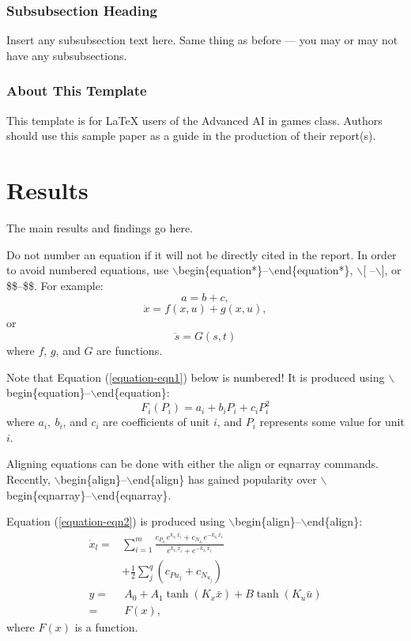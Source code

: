 \documentclass[conference]{IEEEtran}
\begin{document}
\subsubsection{Subsubsection Heading}
Insert any subsubsection text here.  Same thing as before --- you may
or may not have any subsubsections.

\subsubsection{About This Template}
This template is for LaTeX users of the Advanced AI in games class.
Authors should use this sample paper as a guide in the production of
their report(s).

\section{Results}
The main results and findings go here.

Do not number an equation if it will not be directly cited in the
report. In order to avoid numbered equations, use
$\backslash$begin\{equation*\}--$\backslash$end\{equation*\},
$\backslash$[ --$\backslash$], or \$\$--\$\$.  For example:
\begin{equation*}
a = b + c,
\end{equation*}
$$\dot x = f(x,u) + g(x,u),$$
or
\[\ddot s=G(s,t)\]
where $f$, $g$, and $G$ are functions.

Note that Equation (\ref{equation-eqn1}) below is numbered!  It is
produced using $\backslash$begin\{equation\}--$\backslash$end\{equation\}:
\begin{equation}
F_i(P_i)=a_{i}+b_{i}P_i+c_{i}P_{i}^2
\label{equation-eqn1}
\end{equation}
where $a_{i},\ b_{i}$, and $c_{i}$ are coefficients of unit $i$, and $P_i$
represents some value for unit $i$.

Aligning equations can be done with
either the align or eqnarray commands.  Recently,
$\backslash$begin\{align\}--$\backslash$end\{align\} has gained popularity
over $\backslash$begin\{eqnarray\}--$\backslash$end\{eqnarray\}.

Equation (\ref{equation-eqn2}) is produced using
$\backslash$begin\{align\}--$\backslash$end\{align\}:
\begin{align}
\dot {x}_l=& \sum_{i = 1}^m {\frac{c_{P_{x_i} } e^{k_{x_i}\bar{x}_i} + c_{N_{x_i} }
e^{ -  k_{x_i} \bar{x}_i}}{e^{k_{x_i} \bar{x}_i} + e^{ - k_{x_i} \bar{x}_i}}} \nonumber\\
& + \frac{1}{2}\sum\limits_j^q (c_{P{u_j }} + c_{N _{u_j }} ) \nonumber\\
y=& \ A_0 + A_1 \tanh (K_x \bar {x}) + B\tanh (K_u \bar {u}) \nonumber\\
 =& \ F(x),
\label{equation-eqn2}
\end{align}
where $F(x)$ is a function.
\end{document}
